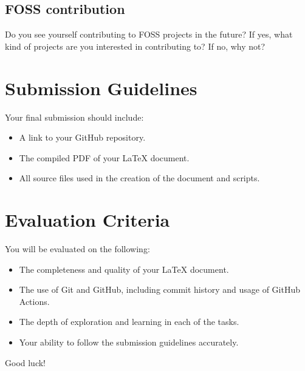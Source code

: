 \documentclass[12pt]{article}
\begin{document}
\subsection{FOSS contribution}
Do you see yourself contributing to FOSS projects in the future? If yes, what kind of projects are you interested in contributing to? If no, why not?

\pagebreak

\section*{Submission Guidelines}
Your final submission should include:
\begin{itemize}
    \item A link to your GitHub repository.
    \item The compiled PDF of your LaTeX document.
    \item All source files used in the creation of the document and scripts.
\end{itemize}

\section*{Evaluation Criteria}
You will be evaluated on the following:
\begin{itemize}
    \item The completeness and quality of your LaTeX document.
    \item The use of Git and GitHub, including commit history and usage of GitHub Actions.
    \item The depth of exploration and learning in each of the tasks.

\item Your ability to follow the submission guidelines accurately.
\end{itemize}

Good luck!
\end{document}
